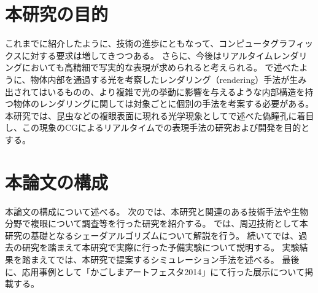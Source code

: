

\section{本研究の目的}
\label{SObjective}

これまでに紹介したように、技術の進歩にともなって、コンピュータグラフィックスに対する要求は増してきつつある。
さらに、今後はリアルタイムレンダリングにおいても高精細で写実的な表現が求められると考えられる。
で述べたように、物体内部を通過する光を考察したレンダリング（rendering）手法が生み出されてはいるものの、より複雑で光の挙動に影響を与えるような内部構造を持つ物体のレンダリングに関しては対象ごとに個別の手法を考案する必要がある。
本研究では、昆虫などの複眼表面に現れる光学現象としてで述べた偽瞳孔に着目し、この現象のCGによるリアルタイムでの表現手法の研究および開発を目的とする。

\section{本論文の構成}
\label{SPaper_structure}

本論文の構成について述べる。
次のでは、本研究と関連のある技術手法や生物分野で複眼について調査等を行った研究を紹介する。
では、周辺技術として本研究の基礎となるシェーダアルゴリズムについて解説を行う。
続いてでは、過去の研究を踏まえて本研究で実際に行った予備実験について説明する。
実験結果を踏まえてでは、本研究で提案するシミュレーション手法を述べる。
最後に、応用事例として「かごしまアートフェスタ2014」にて行った展示について掲載する。
